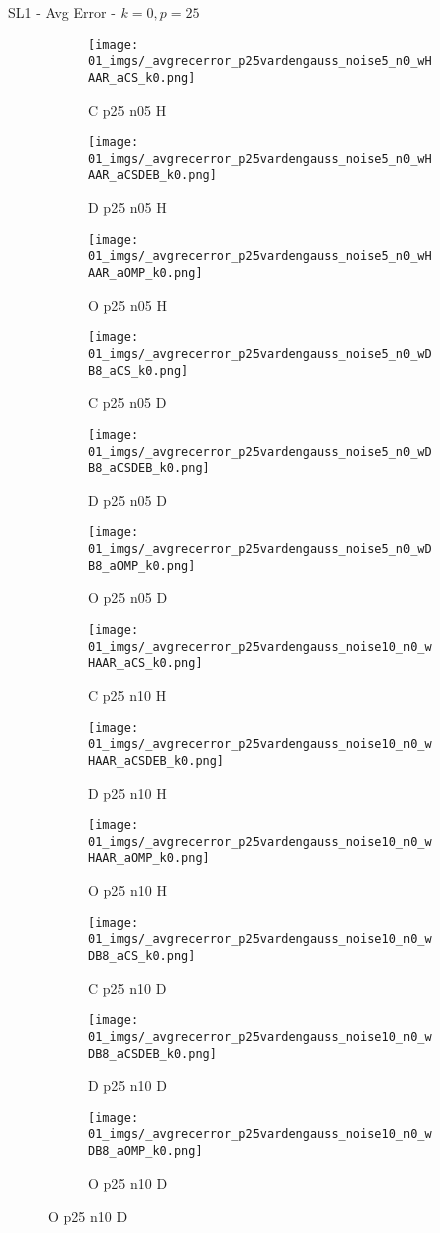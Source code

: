 \begin{frame}{SL1 - Avg Error - $k=0,p=25$}{}
\begin{figure}
\begin{subfigure}{0.13\textwidth}
\texttt{[image: 01\_imgs/\_avgrecerror\_p25vardengauss\_noise5\_n0\_wHAAR\_aCS\_k0.png]}
\caption*{\tiny C p25 n05 H}
\end{subfigure}
\begin{subfigure}{0.13\textwidth}
\texttt{[image: 01\_imgs/\_avgrecerror\_p25vardengauss\_noise5\_n0\_wHAAR\_aCSDEB\_k0.png]}
\caption*{\tiny D p25 n05 H}
\end{subfigure}
\begin{subfigure}{0.13\textwidth}
\texttt{[image: 01\_imgs/\_avgrecerror\_p25vardengauss\_noise5\_n0\_wHAAR\_aOMP\_k0.png]}
\caption*{\tiny O p25 n05 H}
\end{subfigure}
\begin{subfigure}{0.13\textwidth}
\texttt{[image: 01\_imgs/\_avgrecerror\_p25vardengauss\_noise5\_n0\_wDB8\_aCS\_k0.png]}
\caption*{\tiny C p25 n05 D}
\end{subfigure}
\begin{subfigure}{0.13\textwidth}
\texttt{[image: 01\_imgs/\_avgrecerror\_p25vardengauss\_noise5\_n0\_wDB8\_aCSDEB\_k0.png]}
\caption*{\tiny D p25 n05 D}
\end{subfigure}
\begin{subfigure}{0.13\textwidth}
\texttt{[image: 01\_imgs/\_avgrecerror\_p25vardengauss\_noise5\_n0\_wDB8\_aOMP\_k0.png]}
\caption*{\tiny O p25 n05 D}
\end{subfigure}

\vspace{5pt}

\begin{subfigure}{0.13\textwidth}
\texttt{[image: 01\_imgs/\_avgrecerror\_p25vardengauss\_noise10\_n0\_wHAAR\_aCS\_k0.png]}
\caption*{\tiny C p25 n10 H}
\end{subfigure}
\begin{subfigure}{0.13\textwidth}
\texttt{[image: 01\_imgs/\_avgrecerror\_p25vardengauss\_noise10\_n0\_wHAAR\_aCSDEB\_k0.png]}
\caption*{\tiny D p25 n10 H}
\end{subfigure}
\begin{subfigure}{0.13\textwidth}
\texttt{[image: 01\_imgs/\_avgrecerror\_p25vardengauss\_noise10\_n0\_wHAAR\_aOMP\_k0.png]}
\caption*{\tiny O p25 n10 H}
\end{subfigure}
\begin{subfigure}{0.13\textwidth}
\texttt{[image: 01\_imgs/\_avgrecerror\_p25vardengauss\_noise10\_n0\_wDB8\_aCS\_k0.png]}
\caption*{\tiny C p25 n10 D}
\end{subfigure}
\begin{subfigure}{0.13\textwidth}
\texttt{[image: 01\_imgs/\_avgrecerror\_p25vardengauss\_noise10\_n0\_wDB8\_aCSDEB\_k0.png]}
\caption*{\tiny D p25 n10 D}
\end{subfigure}
\begin{subfigure}{0.13\textwidth}
\texttt{[image: 01\_imgs/\_avgrecerror\_p25vardengauss\_noise10\_n0\_wDB8\_aOMP\_k0.png]}
\caption*{\tiny O p25 n10 D}
\end{subfigure}


\end{figure}
\end{frame}
